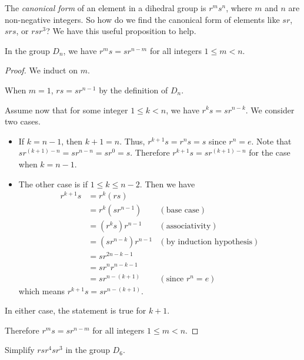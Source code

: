 The \textit{canonical form} of an element in a dihedral group is $r^ms^n$, where $m$ and $n$ are non-negative integers. So how do we find the canonical form of elements like $sr$, $srs$, or $rsr^3$? We have this useful proposition to help.
\begin{proposition}\label{prop-Dn-cannonical-form}
    In the group $D_n$, we have $r^ms = sr^{n-m}$ for all integers $1 \leq m < n$.
\end{proposition}
\begin{proof}
    We induct on $m$.
    
    When $m = 1$, $rs = sr^{n-1}$ by the definition of $D_n$.
    
    Assume now that for some integer $1 \leq k < n$, we have $r^ks = sr^{n-k}$. We consider two cases.
    \begin{itemize}
        \item If $k = n - 1$, then $k + 1 = n$. Thus, $r^{k+1}s = r^ns = s$ since $r^n = e$. Note that $sr^{(k+1)-n} = sr^{n-n} = sr^0 = s$. Therefore $r^{k+1}s = sr^{(k+1)-n}$ for the case when $k = n - 1$.
        \item The other case is if $1 \leq k \leq n - 2$. Then we have
        \begin{align*}
            r^{k+1}s &= r^k(rs)\\
            &= r^k(sr^{n-1}) & (\text{base case})\\
            &= (r^ks)r^{n-1} & (\text{associativity})\\
            &= (sr^{n-k})r^{n-1} & (\text{by induction hypothesis})\\
            &= sr^{2n - k - 1}\\
            &= sr^nr^{n-k-1}\\
            &= sr^{n-(k+1)} & (\text{since } r^n = e)
        \end{align*}
        which means $r^{k+1}s = sr^{n-(k+1)}$.
    \end{itemize}
    In either case, the statement is true for $k+1$.
    
    Therefore $r^ms = sr^{n-m}$ for all integers $1 \leq m < n$.
\end{proof}

\begin{exercise}
    Simplify $rsr^4sr^3$ in the group $D_6$.
\end{exercise}

\newpage

